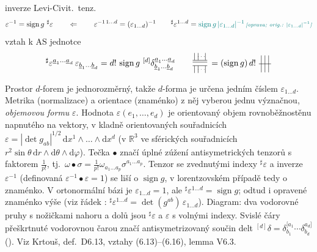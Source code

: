 inverze Levi-Civit.\ tenz.
\[
  \varepsilon^{-1} = \operatorname{sign}g\ {}^\sharp\varepsilon
  \qquad\Leftarrow\qquad \varepsilon^{-1\,1\dots d} = (\varepsilon_{1\dots d})^{-1} \qquad {}^\sharp\varepsilon^{1\dots d} = \oprava{\operatorname{sign}g\,|\varepsilon_{1\dots d}|^{-1}}{|\varepsilon_{1\dots d}|^{-1}}
\]
vztah k AS jednotce
\[
  {}^\sharp\varepsilon^{\underline{a}_1\dots\underline{a}_d}\,\varepsilon_{\underline{b}_1\dots\underline{b}_d} = d!\,\operatorname{sign}g\ {}^{[d]}\delta^{\underline{a}_1\dots\underline{a}_d}_{\underline{b}_1\dots\underline{b}_d}
  \qquad
  \begin{tikzpicture}[baseline=-2pt,scale=0.5]
    \draw (-0.6,0.15) -- (0.6,0.15); \draw (-0.6,0.3) -- (0.6,0.3);
    \foreach \x in {-0.45,-0.15,0.45} \draw (\x,0.3) -- (\x,0.9);
    \node at (0.15,0.6) {\tiny$\cdots$};
    \draw (-0.6,-0.15) -- (0.6,-0.15);
    \foreach \x in {-0.45,-0.15,0.45} \draw (\x,-0.15) -- (\x,-0.75);
    \node at (0.15,-0.45) {\tiny$\cdots$};
  \end{tikzpicture}
  = (\operatorname{sign}g)\,d!\
  \begin{tikzpicture}[baseline=-2pt,scale=0.5]
    \foreach \x in {-0.3,0,0.3} \draw (\x,-0.7) -- (\x,0.7);
    \draw (-0.5,0) -- (0.5,0);
  \end{tikzpicture}
\]

\begin{vysvetleni}
Prostor $d$-forem je jednorozměrný, takže $d$-forma je určena jedním číslem $\varepsilon_{1\dots d}$. Metrika (normalizace) a orientace (znaménko) z něj vyberou jednu význačnou, \emph{objemovou formu} $\varepsilon$. Hodnota $\varepsilon(e_1,\dots,e_d)$ je orientovaný objem rovnoběžnostěnu napnutého na vektory, v kladně orientovaných souřadnicích $\varepsilon=|\det g_{ab}|^{1/2}\,\mathrm{d}x^1\wedge\dots\wedge\mathrm{d}x^d$ (v $\mathbb{R}^3$ ve sférických souřadnicích $r^2\sin\theta\,\mathrm{d}r\wedge\mathrm{d}\theta\wedge\mathrm{d}\varphi$).
Tečka $\bullet$ značí úplné zúžení antisymetrických tenzorů s faktorem $\frac1{p!}$, tj.\ $\omega\bullet\sigma=\frac1{p!}\omega_{a_1\dots a_p}\sigma^{a_1\dots a_p}$.
Tenzor se zvednutými indexy ${}^\sharp\varepsilon$ a inverze $\varepsilon^{-1}$ (definovaná $\varepsilon^{-1}\bullet\varepsilon=1$) se liší o $\operatorname{sign}g$, v lorentzovském případě tedy o znaménko. V ortonormální bázi je $\varepsilon_{1\dots d}=1$, ale ${}^\sharp\varepsilon^{1\dots d}=\operatorname{sign}g$; odtud i opravené znaménko výše (viz řádek : ${}^\sharp\varepsilon^{1\dots d}=\det(g^{ab})\,\varepsilon_{1\dots d}$).
Diagram: dva vodorovné pruhy s nožičkami nahoru a dolů jsou ${}^\sharp\varepsilon$ a $\varepsilon$ s volnými indexy. Svislé čáry přeškrtnuté vodorovnou čarou značí antisymetrizovaný součin delt ${}^{[d]}\delta=\delta^{[a_1}_{b_1}\cdots\delta^{a_d]}_{b_d}$ (\uv{AS jednotka}).
Viz Krtouš, def.~D6.13, vztahy (6.13)--(6.16), lemma V6.3.
\end{vysvetleni}

